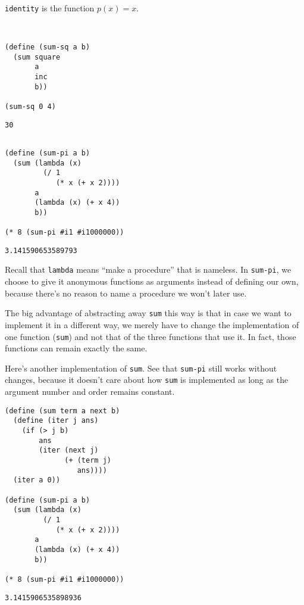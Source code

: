 \documentclass[9pt]{report}
\begin{document}
\texttt{identity} is the function \(p(x) = x\).

\begin{verbatim}


(define (sum-sq a b)
  (sum square
       a
       inc
       b))

(sum-sq 0 4)
\end{verbatim}

\begin{verbatim}
30
\end{verbatim}


\begin{verbatim}

(define (sum-pi a b)
  (sum (lambda (x)
         (/ 1
            (* x (+ x 2))))
       a
       (lambda (x) (+ x 4))
       b))

(* 8 (sum-pi #i1 #i1000000))
\end{verbatim}

\begin{verbatim}
3.141590653589793
\end{verbatim}


Recall that \texttt{lambda} means ``make a procedure'' that is nameless. In
\texttt{sum-pi}, we choose to give it anonymous functions as arguments
instead of defining our own, because there's no reason to name a
procedure we won't later use.

The big advantage of abstracting away \texttt{sum} this way is that in
case we want to implement it in a different way, we merely have to
change the implementation of one function (\texttt{sum}) and not that of
the three functions that use it. In fact, those functions can
remain exactly the same.

Here's another implementation of \texttt{sum}. See that \texttt{sum-pi} still
works without changes, because it doesn't care about how \texttt{sum} is
implemented as long as the argument number and order remains
constant.

\begin{verbatim}
(define (sum term a next b)
  (define (iter j ans)
    (if (> j b)
        ans
        (iter (next j)
              (+ (term j)
                 ans))))
  (iter a 0))

(define (sum-pi a b)
  (sum (lambda (x)
         (/ 1
            (* x (+ x 2))))
       a
       (lambda (x) (+ x 4))
       b))

(* 8 (sum-pi #i1 #i1000000))
\end{verbatim}

\begin{verbatim}
3.1415906535898936
\end{verbatim}
\end{document}
